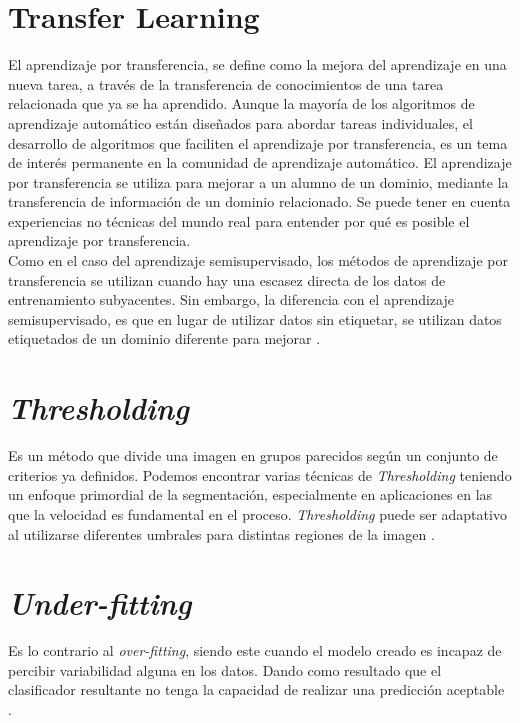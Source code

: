 \newpage
\section{Transfer Learning}
El aprendizaje por transferencia, se define como la mejora del aprendizaje en una nueva tarea, a través de la transferencia de conocimientos de una tarea relacionada que ya se ha aprendido. Aunque la mayoría de los algoritmos de aprendizaje automático están diseñados para abordar tareas individuales, el desarrollo de algoritmos que faciliten el aprendizaje por transferencia, es un tema de interés permanente en la comunidad de aprendizaje automático. El aprendizaje por transferencia se utiliza para mejorar a un alumno de un dominio, mediante la transferencia de información de un dominio relacionado. Se puede tener en cuenta experiencias no técnicas del mundo real para entender por qué es posible el aprendizaje por transferencia.\\

Como en el caso del aprendizaje semisupervisado, los métodos de aprendizaje por transferencia se utilizan cuando hay una escasez directa de los datos de entrenamiento subyacentes. Sin embargo, la diferencia con el aprendizaje semisupervisado, es que en lugar de utilizar datos sin etiquetar, se utilizan datos etiquetados de un dominio diferente para mejorar \cite{ref_14}.

\section{\textit{Thresholding}}


Es un método que divide una imagen en grupos parecidos según un conjunto de criterios ya definidos. Podemos encontrar varias técnicas de \textit{Thresholding} teniendo un enfoque primordial de la segmentación, especialmente en aplicaciones en las que la velocidad es fundamental en el proceso. \textit{Thresholding} puede ser adaptativo al utilizarse diferentes umbrales para distintas regiones de la imagen \cite{kulkarni2012color}.


\section{\textit{Under-fitting}}

Es lo contrario al \textit{over-fitting}, siendo este cuando el modelo creado es incapaz de percibir variabilidad alguna en los datos. Dando como resultado que el clasificador resultante no tenga la capacidad de realizar una predicción aceptable \cite{jabbar2015methods}.

